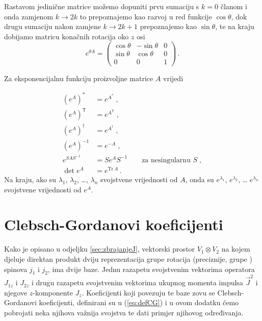 Rastavom jedinične matrice možemo dopuniti prvu sumaciju s $k=0$ članom
i onda zamjenom $k\to 2k$ to prepoznajemo kao razvoj u red funkcije $\cos\theta$,
dok drugu sumaciju nakon zamjene $k \to  2k+1$ prepoznajemo kao $\sin\theta$,
te na kraju dobijamo matricu konačnih rotacija oko $z$ osi
\begin{equation}
    e^{\theta A} =  
            \begin{pmatrix}
                \cos\theta & -\sin\theta & 0 \\
                \sin\theta & \cos\theta & 0 \\
                0 & 0 & 1
            \end{pmatrix} \,.
\end{equation}

Za eksponencijalnu funkciju proizvoljne matrice $A$ vrijedi

\begin{align}
    \left(e^A\right)^* &= e^{A^*} \;,  \\
    \left(e^A\right)^\mathsf{T} &= e^{A^\mathsf{T}} \;,  \\
    \left(e^A\right)^\dagger &= e^{A^\dagger} \;,  \\
    \left(e^A\right)^{-1} &= e^{-A} \;,  \\
    e^{SAS^{-1}} &= Se^{A}S^{-1} \qquad \text{za nesingularnu $S$} \;,  \\
    \det e^{A} &= e^{\mathrm{Tr}\,A} \,.
\end{align}
Na kraju, ako su $\lambda_1$, $\lambda_{2}$, \ldots, $\lambda_n$ svojstvene
vrijednosti od $A$, onda su $e^{\lambda_{1}}$, $e^{\lambda_2}$, \ldots
    $e^{\lambda_n}$ svojstvene vrijednosti od $e^A$.

\chapter{Clebsch-Gordanovi koeficijenti}
\label{sec:clebsch}

Kako je opisano u odjeljku \ref{sec:zbrajanjeJ}, vektorski prostor
$V_1 \otimes V_2$ na kojem djeluje direktan produkt dviju reprezentacija
grupe rotacija (preciznije, grupe ) spinova $j_1$ i $j_2$, ima
dvije baze. Jednu razapetu svojstvenim vektorima operatora $J_{1z}$
i $J_{2z}$ i drugu razapetu svojstvenim vektorima ukupnog momenta
impulsa  $\vec{J}^2$ i njegove $z$-komponente $J_z$.
Koeficijenti koji povezuju te baze zovu se Clebsch-Gordanovi koeficijenti,
definirani su u (\ref{eq:defCG}) i u ovom dodatku ćemo pobrojati neka
njihova važnija svojstva te dati primjer njihovog određivanja.


